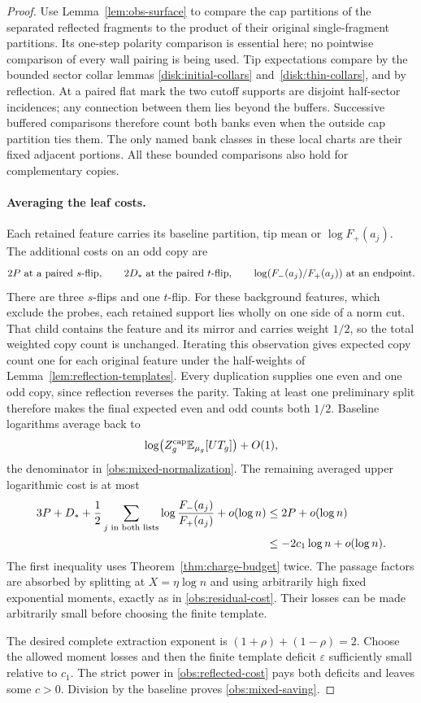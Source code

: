 \begin{proof}
Use Lemma~\ref{lem:obs-surface} to compare the cap partitions of
the separated reflected fragments to the product of their original
single-fragment partitions.  Its one-step polarity comparison is
essential here; no pointwise comparison of every wall pairing is
being used.  Tip expectations compare by the bounded sector collar
lemmas \ref{disk:initial-collars} and~\ref{disk:thin-collars}, and
by reflection.  At a paired flat mark the two cutoff supports are
disjoint half-sector incidences; any connection between them lies
beyond the buffers.  Successive buffered comparisons therefore
count both banks even when the outside cap partition ties them.
The only named bank classes in these local charts are their fixed
adjacent portions.  All these bounded comparisons also hold for
complementary copies.

\paragraph{Averaging the leaf costs.}
Each retained feature carries its baseline partition, tip mean or
$\log F_+(a_j)$.  The additional costs on an odd copy are
\[
 2P\ \hbox{at a paired }s\hbox{-flip},\qquad
 2D_*\ \hbox{at the paired }t\hbox{-flip},\qquad
 \log(F_-(a_j)/F_+(a_j))\ \hbox{at an endpoint}.
\]
There are three $s$-flips and one $t$-flip.  For these background
features, which exclude the probes, each retained support lies wholly
on one side of a norm cut.  That child contains the
feature and its mirror and carries weight $1/2$, so the total weighted
copy count is unchanged.  Iterating this observation gives expected
copy count one for each original feature under the half-weights of
Lemma~\ref{lem:reflection-templates}.  Every duplication supplies
one even and one odd copy, since reflection reverses the parity.
Taking at least one preliminary split therefore makes the final
expected even and odd counts both $1/2$.  Baseline logarithms average
back to
\[
 \log\bigl(Z_g^{\rm cap}\mathbb E_{\mu_g}[UT_g]\bigr)+O(1),
\]
the denominator in \eqref{obs:mixed-normalization}.  The remaining
averaged upper logarithmic cost is at most
\begin{align}
 3P+D_*+\frac12\sum_{j\text{ in both lists}}
      \log\frac{F_-(a_j)}{F_+(a_j)}+o(\log n)
 &\le 2P+o(\log n)\notag\\
 &\le-2c_1\log n+o(\log n).
 \label{obs:reflected-cost}
\end{align}
The first inequality uses Theorem~\ref{thm:charge-budget} twice.
The passage factors are absorbed by splitting at
$X=\eta\log n$ and using arbitrarily high fixed exponential
moments, exactly as in \eqref{obs:residual-cost}.  Their losses
can be made arbitrarily small before choosing the finite template.

The desired complete extraction exponent is
$(1+\rho)+(1-\rho)=2$.  Choose the allowed moment losses and then
the finite template deficit $\varepsilon$ sufficiently small
relative to $c_1$.  The strict power in
\eqref{obs:reflected-cost} pays both deficits and leaves some
$c>0$.  Division by the baseline proves
\eqref{obs:mixed-saving}.
\end{proof}

